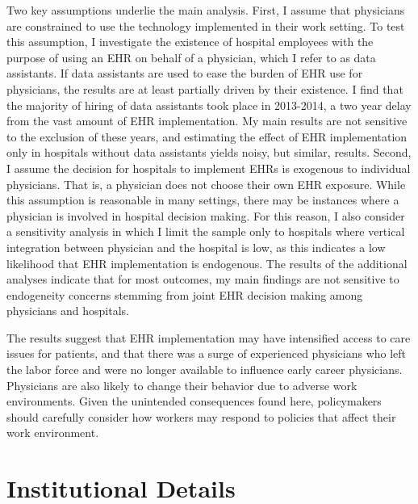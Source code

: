 \documentclass[12pt]{article}
\begin{document}
Two key assumptions underlie the main analysis. First, I assume that physicians are constrained to use the technology implemented in their work setting. To test this assumption, I investigate the existence of hospital employees with the purpose of using an EHR on behalf of a physician, which I refer to as data assistants. If data assistants are used to ease the burden of EHR use for physicians, the results are at least partially driven by their existence. I find that the majority of hiring of data assistants took place in 2013-2014, a two year delay from the vast amount of EHR implementation. My main results are not sensitive to the exclusion of these years, and estimating the effect of EHR implementation only in hospitals without data assistants yields noisy, but similar, results. Second, I assume the decision for hospitals to implement EHRs is exogenous to individual physicians. That is, a physician does not choose their own EHR exposure. While this assumption is reasonable in many settings, there may be instances where a physician is involved in hospital decision making. For this reason, I also consider a sensitivity analysis in which I limit the sample only to hospitals where vertical integration between physician and the hospital is low, as this indicates a low likelihood that EHR implementation is endogenous. The results of the additional analyses indicate that for most outcomes, my main findings are not sensitive to endogeneity concerns stemming from joint EHR decision making among physicians and hospitals.


The results suggest that EHR implementation may have intensified access to care issues for patients, and that there was a surge of experienced physicians who left the labor force and were no longer available to influence early career physicians. Physicians are also likely to change their behavior due to adverse work environments. Given the unintended consequences found here, policymakers should carefully consider how workers may respond to policies that affect their work environment. 




\section{Institutional Details}
\end{document}

